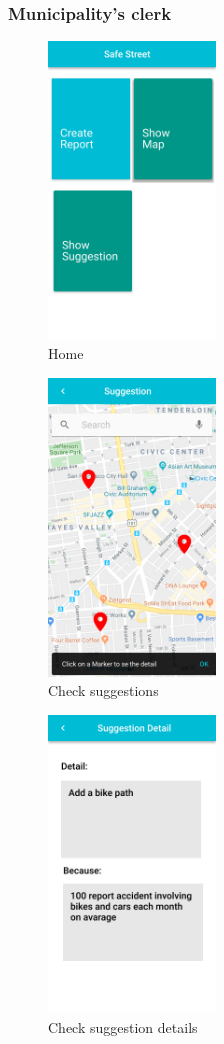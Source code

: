 \documentclass{article}
\begin{document}
\clearpage
\subsubsection{Municipality's clerk}
\begin{figure}[!htb]
		\centering
		\includegraphics[height=7.9cm,keepaspectratio]{images/mockups/Home_Municipality.png}
		\caption{Home}
\end{figure}

\begin{figure}[!htb]
		\centering
		\includegraphics[height=7.9cm,keepaspectratio]{images/mockups/Suggestions.png}
		\caption{Check suggestions}
\end{figure}

\clearpage
\begin{figure}[!htb]
		\centering
		\includegraphics[height=7.9cm,keepaspectratio]{images/mockups/Suggestions_Detail.png}
		\caption{Check suggestion details}
\end{figure}
\end{document}
